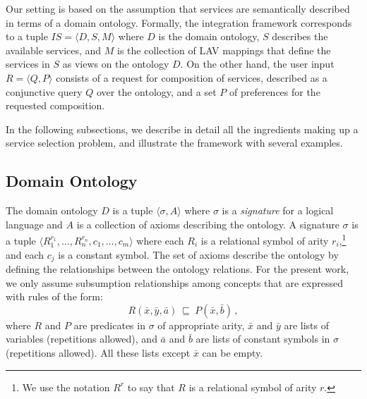 \documentclass{llncs}
\newcommand{\tup}[1]{\langle #1 \rangle}
\newcommand{\orule}{\sqsubseteq}
\begin{document}
Our setting is based on the assumption that services are
semantically described in terms of a domain ontology. 
Formally, the integration framework corresponds to a tuple
$IS=\tup{D,S,M}$ where $D$ is the domain ontology, $S$ describes
the available services, and $M$ is the collection of LAV mappings
that define the services in $S$ as views on the ontology $D$. 
On the other hand, the user input $R=\tup{Q,P}$ consists of a
request for composition of services, described as a conjunctive
query $Q$ over the ontology, and a set $P$ of preferences for
the requested composition.

In the following subsections, we describe in detail all the
ingredients making up a service selection problem, and illustrate
the framework with several examples.

\subsection{Domain Ontology}

The domain ontology $D$ is a tuple $\tup{\sigma,A}$ where $\sigma$ is a
\emph{signature} for a logical language and $A$ is a collection of axioms
describing the ontology.
A signature $\sigma$ is a tuple $\tup{R_1^{r_1},\ldots,R_n^{r_n},c_1,\ldots,c_m}$
where each $R_i$ is a relational symbol of arity $r_i$,\footnote{We use
the notation $R^r$ to say that $R$ is a relational symbol of arity $r$.}
and each $c_j$ is a constant symbol.
The set of axioms describe the ontology by defining the relationships
between the ontology relations. %
For the present work, we only assume subsumption relationships among
concepts that are expressed with rules of the form:
\begin{equation}
\label{eq:orule}
R(\bar x,\bar y, \bar a)\ \orule\ P(\bar x, \bar b)\,,
\end{equation}
where $R$ and $P$ are predicates in $\sigma$ of appropriate arity,
$\bar x$ and $\bar y$ are lists of variables (repetitions allowed),
and $\bar a$ and $\bar b$ are lists of constant symbols in $\sigma$
(repetitions allowed). All these lists except $\bar x$ can be empty.
\end{document}
